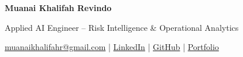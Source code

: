 {\LARGE \textbf{Muanai Khalifah Revindo}}

\vspace{2pt}
{\large Applied AI Engineer -- Risk Intelligence \& Operational Analytics}

\vspace{6pt}

\href{mailto:muanaikhalifahr@gmail.com}{muanaikhalifahr@gmail.com}
\quad | \quad
\href{https://linkedin.com/in/muanai-khalifah-revindo}{LinkedIn}
\quad | \quad
\href{https://github.com/Muanai}{GitHub}
\quad | \quad
\href{https://muanai.github.io/}{Portfolio}